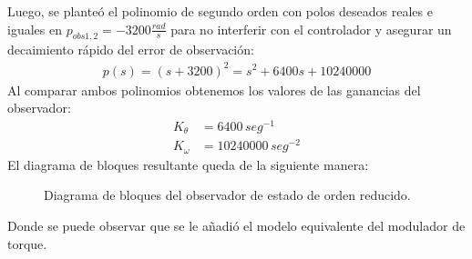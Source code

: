 \documentclass[a4paper, 10pt, onecolumn,journal]{ieeeconf}
\begin{document}
Luego, se planteó el polinomio de segundo orden con polos deseados reales e iguales en $p_{obs1,2} = -3200 \frac{rad}{s}$ para no interferir con el controlador y asegurar un decaimiento rápido del error de observación:
\begin{align}
	p(s) = \left( s + 3200\right) ^2 = s^2 + 6400 s + 10240000\label{polinomeo caracteristico de observador deseado}
\end{align}
Al comparar ambos polinomios obtenemos los valores de las ganancias del observador:
\begin{align}
	K_{\theta} &= 6400 \, seg^{-1}\label{ganacia de posicion de observador}\\
	K_{\omega} &= 10240000 \, seg^{-2}\label{ganacia de velocidad de observador}
\end{align}
El diagrama de bloques resultante queda de la siguiente manera:
\begin{figure}[H]
	\centering
	\begin{adjustbox}{max width=\columnwidth,scale=0.8}
	\end{adjustbox}
	\caption{Diagrama de bloques del observador de estado de orden reducido.}
	\label{Diagrama de bloques del observador de estado de orden reducido}
\end{figure}
Donde se puede observar que se le añadió el modelo equivalente del modulador de torque.
\end{document}
